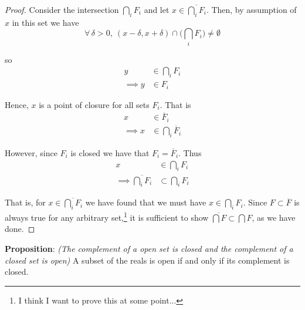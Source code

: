 \documentclass[12pt]{article}
\newlength\tindent
\renewcommand{\indent}{\hspace*{\tindent}}
\begin{document}
\begin{proof} Consider the intersection $\bigcap_i F_i$ and let $x \in \overline{\bigcap_i F_i}$. Then, by assumption of $x$ in this set we have
\begin{equation*}
	\forall\,\delta > 0,~ (x - \delta, x + \delta) \cap \Big( \bigcap_i F_i \Big) \neq \emptyset
\end{equation*}

so
\begin{align*}
	y &\in \bigcap_i F_i \\
	\implies y &\in F_i
\end{align*}

Hence, $x$ is a point of closure for all sets $F_i$. That is
\begin{align*}
	x &\in \overline{F}_i \\
	\implies x &\in \bigcap_i \overline{F}_i
\end{align*}

However, since $F_i$ is closed we have that $F_i = \overline{F}_i$. Thus
\begin{align*}
	x &\in \bigcap_i F_i \\
	\implies \overline{\bigcap_i F_i} &\subset \bigcap_i F_i
\end{align*}

\indent That is, for $x \in \overline{\bigcap_i F_i}$ we have found that we must have $x \in \bigcap_i F_i$. Since $F \subset \overline{F}$ is always true for any arbitrary set,\footnote{I think I want to prove this at some point...} it is sufficient to show $\overline{\bigcap F} \subset \bigcap F$, as we have done.
\end{proof}

%
%
{\bf Proposition}: {\em (The complement of a open set is closed and the complement of a closed set is open)} A subset of the reals is open if and only if its complement is closed.
\end{document}
